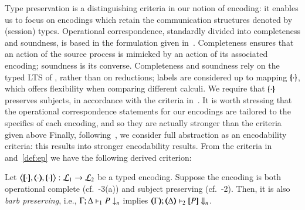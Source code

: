 \smallskip 

\noi Type preservation is a distinguishing criteria in our notion of encoding: it enables us to focus on encodings which retain the communication structures denoted by (session) types.
Operational correspondence, standardly divided into completeness and soundness, is based
in the formulation given in~\cite{DBLP:journals/iandc/Gorla10,DBLP:conf/icalp/LanesePSS10}. 
Completeness ensures that an action of the source process is mimicked
by an action of its associated encoding; soundness is its converse.
Completeness and soundness rely on 
the typed LTS of , 
rather than on reductions;
labels are considered up to  mapping $\{\!\!\{\cdot\}\!\!\}$, which offers flexibility when comparing different calculi. We require that $\{\!\!\{\cdot\}\!\!\}$ preserves  subjects, in accordance with the criteria in~\cite{DBLP:conf/icalp/LanesePSS10}.
It is worth stressing that 
the operational correspondence statements 
for our encodings 
 are tailored to the specifics of each encoding, and so they
 are actually stronger than the criteria given above
Finally, following~\cite{SangiorgiD:expmpa,DBLP:conf/lics/PalamidessiSVV06,Yoshida96},
we consider full abstraction as an encodability criteria: this results into 
stronger encodability results. 
From the criteria in  and~\ref{def:ep}
we have the following derived criterion: 

\smallskip 

\begin{proposition}\label{p:barbpres}
Let
	$\enco{\map{\cdot}, \mapt{\cdot}, \mapa{\cdot}}: \tyl{L}_1 \to \tyl{L}_2$
	be a typed encoding.
	Suppose the encoding is both
 operational complete (cf.~-3(a)) 
 and subject preserving (cf.~-2).
 Then, it is also \emph{barb preserving}, i.e., 
$\Gamma; \Delta \vdash_1 P \downarrow_{n}$
implies
$\mapt{\Gamma}; \mapt{\Delta} \proves_2 \map{P} \Barb{n}$.
\end{proposition}

